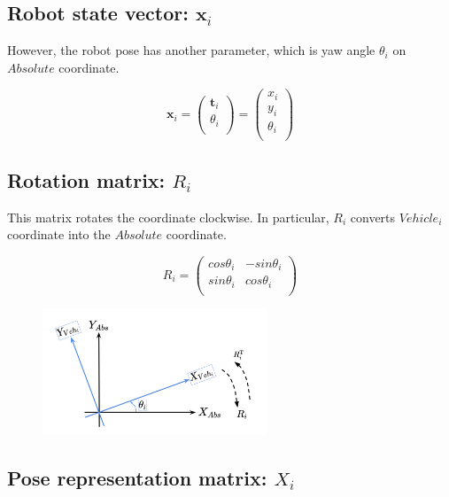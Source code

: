 \documentclass{article}
\begin{document}
\subsection{Robot state vector: $\bm{x}_i$}

However, the robot pose has another parameter, which is yaw angle $\theta_i$ on $Absolute$ coordinate.

\[
\bm{x}_i =
\left(
  \begin{array}{c}
    \bm{t}_i \\
    \theta_i \\
  \end{array}
\right)
=
\left(
  \begin{array}{c}
    x_i \\
    y_i \\
    \theta_i \\
  \end{array}
\right)
\]

\newpage

\subsection{Rotation matrix: $R_i$}

This matrix rotates the coordinate clockwise.
In particular, $R_i$ converts $Vehicle_i$ coordinate into the $Absolute$ coordinate.

\[
R_i =
\left(
  \begin{array}{ccc}
    cos\theta_i & -sin\theta_i \\
    sin\theta_i &  cos\theta_i \\
  \end{array}
\right)
\]

\begin{figure}[h!]
  \centering
  \includegraphics[width=0.6\textwidth]{2-2_rotation_matrix.png}
\end{figure}

\subsection{Pose representation matrix: $X_i$}
\end{document}
